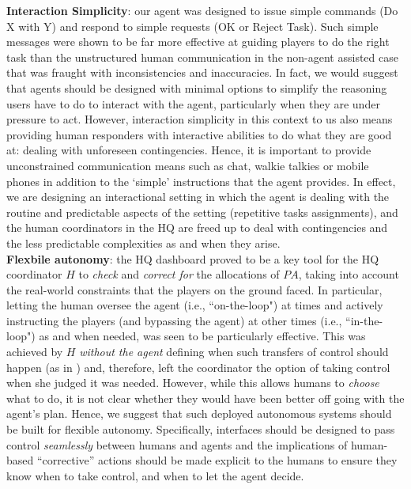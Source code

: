 \noindent \textbf{Interaction Simplicity}: our agent was designed to issue simple commands (Do X with Y) and respond to simple requests (OK or Reject Task). Such simple messages were shown to be far more effective at guiding players to do the right task than the unstructured human communication in the non-agent assisted case that was fraught with inconsistencies and inaccuracies. In fact, we would suggest that agents should be designed with minimal options to simplify the reasoning users have to do to interact with the agent, particularly when they are under pressure to act. However, interaction simplicity in this context to us also means providing human responders with interactive abilities to do what they are good at: dealing with unforeseen contingencies. Hence, it is important to provide unconstrained communication means such as chat, walkie talkies or mobile phones in addition to the `simple' instructions that the agent provides. In effect, we are designing an interactional setting in which the agent is dealing with the routine and predictable aspects of the setting (repetitive tasks assignments), and the human coordinators in the HQ are freed up to deal with contingencies and the less predictable complexities as and when they arise.\\

\noindent \textbf{Flexbile autonomy}: the HQ dashboard proved to be a key tool for the HQ coordinator $H$ to \emph{check} and \emph{correct for} the allocations of $PA$, taking into account the real-world constraints that the players on the ground faced. In particular, letting the human oversee the agent (i.e., ``on-the-loop") at times and actively instructing  the players (and bypassing the agent) at other times (i.e., ``in-the-loop") as and when needed, was seen to be particularly effective. This was achieved by $H$ \emph{without the agent} defining when such transfers of control should happen (as in \cite{scerri:etal:2005}) and, therefore, left the coordinator the option of taking control when she judged it was needed. However, while this allows humans to \emph{choose} what to do, it is not clear whether they would have been better off going with the agent's plan. Hence, we suggest that such deployed autonomous systems should be built for flexible autonomy. Specifically, interfaces should be designed to pass control \emph{seamlessly} between humans and agents and the implications of human-based ``corrective'' actions  should be made explicit to the humans to ensure they know when to take control, and when to let the agent decide.

